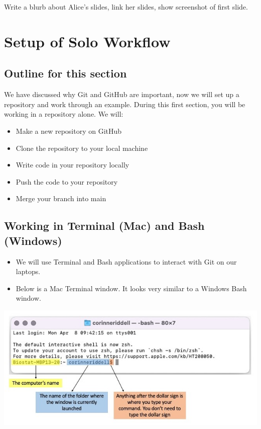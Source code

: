 \documentclass[
]{book}
\providecommand{\tightlist}{%
  \setlength{\itemsep}{0pt}\setlength{\parskip}{0pt}}
\begin{document}
Write a blurb about Alice's slides, link her slides, show screenshot of first slide.

\hypertarget{setup-of-solo-workflow}{%
\chapter{Setup of Solo Workflow}\label{setup-of-solo-workflow}}

\hypertarget{outline-for-this-section}{%
\section{Outline for this section}\label{outline-for-this-section}}

We have discussed why Git and GitHub are important, now we will set up a repository and work through an example. During this first section, you will be working in a repository alone. We will:

\begin{itemize}
\tightlist
\item
  Make a new repository on GitHub\\
\item
  Clone the repository to your local machine\\
\item
  Write code in your repository locally\\
\item
  Push the code to your repository\\
\item
  Merge your branch into main
\end{itemize}

\hypertarget{working-in-terminal-mac-and-bash-windows}{%
\section{Working in Terminal (Mac) and Bash (Windows)}\label{working-in-terminal-mac-and-bash-windows}}

\begin{itemize}
\tightlist
\item
  We will use Terminal and Bash applications to interact with Git on our laptops.
\item
  Below is a Mac Terminal window. It looks very similar to a Windows Bash window.
\end{itemize}

\includegraphics[width=1\linewidth]{./figures/Terminal-explainer-1}
\end{document}
